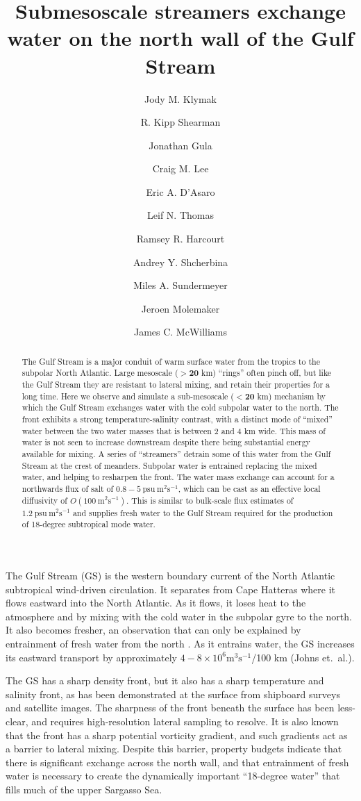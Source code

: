 \documentclass{article}
\title{Submesoscale streamers exchange water on the north wall of the Gulf Stream}
\author[1]{Jody M. Klymak}
\author[2]{R. Kipp Shearman}
\author[3] {Jonathan Gula}
\author[4]{Craig M. Lee}
\author[4]{Eric A. D'Asaro}
\author[5]{Leif N. Thomas}
\author[4]{Ramsey R. Harcourt}
\author[4]{Andrey Y. Shcherbina}
\author[6]{Miles A. Sundermeyer}
\author[7]{Jeroen Molemaker}
\author[7]{James C. McWilliams}
\affil[1]{University of Victoria, Victoria, British Columbia, Canada}
\affil[2]{Oregon State University, Corvallis, Oregon, USA}
\affil[3]{Laboratoire de Physique des Oc\'eans, Universit\'e de Bretagne Occidentale}
\affil[4]{Applied Physics Laboratory, University of Washington, Seattle, Washington USA}
\affil[5]{Stanford University, Stanford, California, USA}
\affil[6]{University of Massachusetts Dartmouth, Dartmouth, Massachusetts, USA}
\affil[7]{University of California, Los Angeles, California, USA }
\begin{document}
\maketitle


\begin{abstract}
The Gulf Stream is a major conduit of warm surface water from the tropics to the subpolar North Atlantic. Large mesoscale ($\mathbf{>20}$ km) ``rings'' often pinch off, but like the Gulf Stream they are resistant to lateral mixing, and retain their properties for a long time.  Here we observe and simulate a sub-mesoscale ($\mathbf{<20}$ km) mechanism by which the Gulf Stream exchanges water with the cold subpolar water to the north. The front exhibits a strong temperature-salinity contrast, with a distinct mode of ``mixed'' water between the two water masses that is between 2 and 4 km wide.  This mass of water is not seen to increase downstream  despite there being substantial energy available for mixing.  A series of ``streamers'' detrain some of this water from the Gulf Stream at the crest of meanders. Subpolar water is entrained replacing the  mixed water, and helping to resharpen the front. The water mass exchange can account for a northwards flux of salt of $0.8-5\ \mathrm{psu\ m^2s^{-1}}$, which can be cast as an effective local diffusivity of $O(100\ \mathrm{m^2s^{-1}})$. This is similar to bulk-scale flux estimates of $1.2\ \mathrm{psu\ m^2s^{-1}}$ and supplies fresh water to the Gulf Stream required for the production of 18-degree subtropical mode water. 
\end{abstract}

The Gulf Stream (GS) is the western boundary current of the North Atlantic subtropical wind-driven circulation.  It separates from Cape Hatteras where it flows eastward into the North Atlantic.  As it flows, it loses heat to  the atmosphere and by mixing with the cold water in the subpolar gyre to the north.  It also becomes fresher, an observation that can only be explained by entrainment of fresh water from the north \cite{joyceetal13}.  As it entrains water, the GS  increases its eastward transport by approximately $4-8\times 10^6 \mathrm{m^3s^{-1}}$/100 km (Johns et.\ al.\cite{johnsetal95}).   

The GS has a sharp density front, but it also has a sharp temperature and salinity front, as has been demonstrated at the surface from shipboard surveys\cite{fordetal52} and satellite images\cite{churchilletal89}. The sharpness of the front beneath the surface has been less-clear, and requires high-resolution lateral sampling to resolve. It is also known that the front has a sharp potential vorticity gradient\cite{rajamonyetal01}, and such gradients act as a barrier to lateral mixing\cite{marshalletal06,naveiraetal11}.  Despite this  barrier, property budgets indicate that there is significant exchange across the north wall\cite{joyceetal13}, and that entrainment of fresh water is necessary to create the dynamically important ``18-degree water'' that fills much of the upper Sargasso Sea. 
\end{document}
